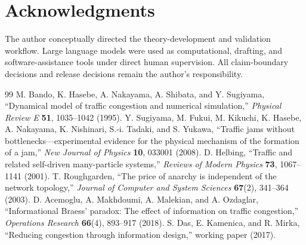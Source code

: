 \documentclass[11pt]{article}
\begin{document}
\section*{Acknowledgments}
The author conceptually directed the theory-development and validation workflow. Large language models were used as computational, drafting, and software-assistance tools under direct human supervision. All claim-boundary decisions and release decisions remain the author's responsibility.

\begin{thebibliography}{99}
 M. Bando, K. Hasebe, A. Nakayama, A. Shibata, and Y. Sugiyama, ``Dynamical model of traffic congestion and numerical simulation,'' \emph{Physical Review E} \textbf{51}, 1035--1042 (1995).
 Y. Sugiyama, M. Fukui, M. Kikuchi, K. Hasebe, A. Nakayama, K. Nishinari, S.-i. Tadaki, and S. Yukawa, ``Traffic jams without bottlenecks---experimental evidence for the physical mechanism of the formation of a jam,'' \emph{New Journal of Physics} \textbf{10}, 033001 (2008).
 D. Helbing, ``Traffic and related self-driven many-particle systems,'' \emph{Reviews of Modern Physics} \textbf{73}, 1067--1141 (2001).
 T. Roughgarden, ``The price of anarchy is independent of the network topology,'' \emph{Journal of Computer and System Sciences} \textbf{67}(2), 341--364 (2003).
 D. Acemoglu, A. Makhdoumi, A. Malekian, and A. Ozdaglar, ``Informational Braess' paradox: The effect of information on traffic congestion,'' \emph{Operations Research} \textbf{66}(4), 893--917 (2018).
 S. Das, E. Kamenica, and R. Mirka, ``Reducing congestion through information design,'' working paper (2017).
\end{thebibliography}
\end{document}
